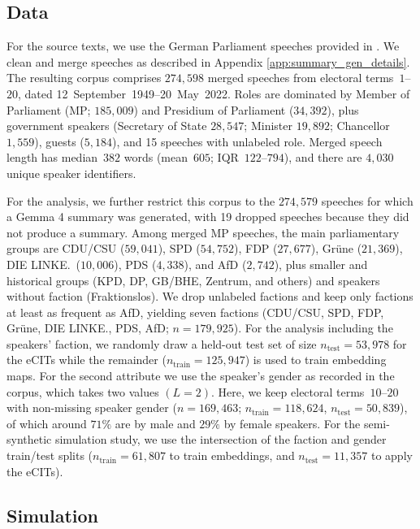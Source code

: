 \documentclass[twoside,11pt]{article}
\begin{document}
\subsection{Data}\label{subsec:data}

For the source texts, we use the German Parliament speeches provided in
\citet{richter2020opendiscourse}.
We clean and merge speeches as described in Appendix \ref{app:summary_gen_details}.
The resulting corpus comprises $274{,}598$ merged speeches from electoral terms~$1$--$20$, dated 12~September~1949--20~May~2022.
Roles are dominated by Member of Parliament (MP; $185{,}009$) and Presidium of Parliament ($34{,}392$), plus government speakers (Secretary of State $28{,}547$; Minister $19{,}892$; Chancellor $1{,}559$), guests ($5{,}184$), and 15 speeches with unlabeled role.
Merged speech length has median~$382$ words (mean~$605$; IQR~$122$--$794$), and there are $4{,}030$ unique speaker identifiers.

For the analysis, we further restrict this corpus to the $274{,}579$ speeches for which a Gemma 4 summary was generated, with 19 dropped speeches because they did not produce a summary.
Among merged MP speeches, the main parliamentary groups are CDU/CSU ($59{,}041$), SPD ($54{,}752$), FDP ($27{,}677$), Gr\"une ($21{,}369$), DIE LINKE.\ ($10{,}006$), PDS ($4{,}338$), and AfD ($2{,}742$), plus smaller and historical groups (KPD, DP, GB/BHE, Zentrum, and others) and speakers without faction (Fraktionslos).
We drop unlabeled factions and keep only factions at least as frequent as AfD, yielding seven factions (CDU/CSU, SPD, FDP, Gr\"une, DIE LINKE., PDS, AfD; $n=179{,}925$). 
For the analysis including the speakers' faction, we randomly draw a held-out test set of size $n_{\mathrm{test}}=53{,}978$ for the eCITs while the remainder ($n_{\mathrm{train}}=125{,}947$) is used to train embedding maps.
For the second attribute we use the speaker's gender as recorded in the corpus, which takes two values $(L=2)$.
Here, we keep electoral terms~$10$--$20$ with non-missing speaker gender ($n=169{,}463$; $n_{\mathrm{train}}=118{,}624$, $n_{\mathrm{test}}=50{,}839$), of which around $71\%$ are by male and $29\%$ by female speakers.
For the semi-synthetic simulation study, we use the intersection of the faction and gender train/test splits ($n_{\mathrm{train}}=61{,}807$ to train embeddings, and $n_{\mathrm{test}}=11{,}357$ to apply the eCITs).


\subsection{Simulation}\label{subsec:simulation}
\end{document}
